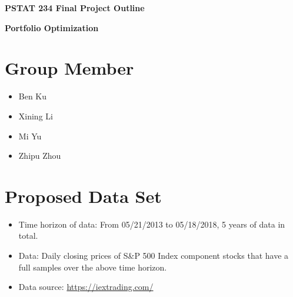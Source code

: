 \documentclass{article}
\begin{document}
\vspace{3.5cm}

\begin{center}
	{\bf\Large PSTAT 234 Final Project Outline}
\end{center}

\vspace{0.1cm}

\begin{center}
	{\bf\large Portfolio Optimization}
\end{center}


\vspace{0.8cm}

\section{Group Member}
\begin{itemize}
	\item Ben Ku
	\item Xining Li
	\item Mi Yu
	\item Zhipu Zhou
\end{itemize}


\section{Proposed Data Set}

\begin{itemize}
	\item Time horizon of data: From 05/21/2013 to 05/18/2018, 5 years of data in total.
	\item Data: Daily closing prices of S\&P 500 Index component stocks that have a full samples over the above time horizon.
	\item Data source: \url{https://iextrading.com/}
\end{itemize}
\end{document}
